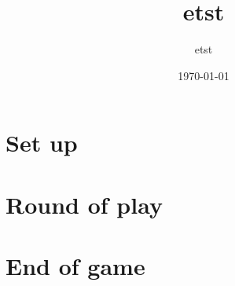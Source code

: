 \documentclass{article}%
\title{etst}%
\author{etst}%
\date{\today}%
\begin{document}
%
\pagestyle{empty}%
\normalsize%
\maketitle%
\pagestyle{header}%
\section{ Set up
}%
\label{sec:Setup}%

%
\section{ Round of play
}%
\label{sec:Roundofplay}%

%
\section{ End of game}%
\label{sec:Endofgame}%

%
\end{document}
